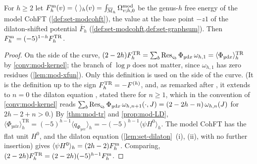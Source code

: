 \begin{cor}
\label{cor:mod-trF}
For $h\geq 2$ let $\Fm_h(v)=\langle\ \rangle_h(v)=\int_{\overline{\mathcal M}_h}\Omega^{\mathrm{mod}}_{v;h,0}$ be the genus-$h$ free energy of the model CohFT (\cref{def:set-modcohft}), the value at the base point $-z1$ of the dilaton-shifted potential $\overline F_h$ (\cref{def:set-modcohft,def:set-graphsum}). Then $F^{\mathrm{m}}_h=(-5)^{1-h}F^{\mathrm{TR}}_h$.
\end{cor}

\begin{proof}
On the side of the curve, $(2-2h)F^{\mathrm{TR}}_h=\sum_b\operatorname*{Res}_{\varsigma_b}\Phi_{y\mathrm{d} x}\,\omega_{h,1}=\langle\Phi_{y\mathrm{d} x}\rangle^{\mathrm{TR}}_h$ by \cref{conv:mod-kernel}; the branch of $\log p$ does not matter, since $\omega_{h,1}$ has zero residues (\cref{lem:mod-xfun}). Only this definition is used on the side of the curve. (It is the definition \cite[Def.~4.3 (4-10)]{Eynard:2007kz} up to the sign $F^{\mathrm{TR}}_h=-F^{(h)}$, and, as remarked after \cite[Thm.~4.7]{Eynard:2007kz}, it extends to $n=0$ the dilaton equation \cite[Thm.~4.7 (4-30)]{Eynard:2007kz}, stated there for $n\geq 1$, which in the convention of \cref{conv:mod-kernel} reads $\sum_b\operatorname*{Res}_{\varsigma_b}\Phi_{y\mathrm{d} x}\,\omega_{h,n+1}(\cdot,J)=(2-2h-n)\,\omega_{h,n}(J)$ for $2h-2+n>0$.) By \cref{thm:mod-tr} and \cref{prop:mod-LD}, $\langle\Phi_{y\dd x}\rangle^{\mathrm{TR}}_h=(-5)^{h-1}\langle q_{\Phi_{y\dd x}}\rangle_h=-(-5)^{h-1}\langle\psi H^0\rangle_h$. The model CohFT has the flat unit $H^0$, and the dilaton equation (\cref{lem:set-dilaton}~(i), (ii), with no further insertion) gives $\langle\psi H^0\rangle_h=(2h-2)F^{\mathrm{m}}_h$. Comparing, $(2-2h)F^{\mathrm{TR}}_h=(2-2h)(-5)^{h-1}F^{\mathrm{m}}_h$.
\end{proof}


